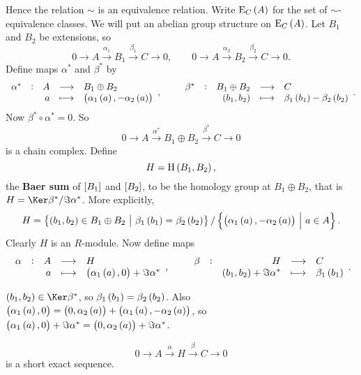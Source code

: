 Hence the relation $ \sim $ is an equivalence relation. Write $ \E_C\br{A} $ for the set of $ \sim $-equivalence classes. We will put an abelian group structure on $ \E_C\br{A} $. Let $ B_1 $ and $ B_2 $ be extensions, so
$$ 0 \to A \xrightarrow{\alpha_1} B_1 \xrightarrow{\beta_1} C \to 0, \qquad 0 \to A \xrightarrow{\alpha_2} B_2 \xrightarrow{\beta_2} C \to 0. $$
Define maps $ \alpha^* $ and $ \beta^* $ by
$$ \function[\alpha^*]{A}{B_1 \oplus B_2}{a}{\br{\alpha_1\br{a}, -\alpha_2\br{a}}}, \qquad \function[\beta^*]{B_1 \oplus B_2}{C}{\br{b_1, b_2}}{\beta_1\br{b_1} - \beta_2\br{b_2}}. $$
Now $ \beta^* \circ \alpha^* = 0 $. So
$$ 0 \to A \xrightarrow{\alpha^*} B_1 \oplus B_2 \xrightarrow{\beta^*} C \to 0 $$
is a chain complex. Define
$$ H = \H\br{B_1, B_2}, $$
the \textbf{Baer sum} of $ \sbr{B_1} $ and $ \sbr{B_2} $, to be the homology group at $ B_1 \oplus B_2 $, that is $ H = \Ker \beta^* / \Im \alpha^* $. More explicitly,
$$ H = \cbr{\br{b_1, b_2} \in B_1 \oplus B_2 \st \beta_1\br{b_1} = \beta_2\br{b_2}} / \cbr{\br{\alpha_1\br{a}, -\alpha_2\br{a}} \st a \in A}. $$
Clearly $ H $ is an $ R $-module. Now define maps
$$ \function[\alpha]{A}{H}{a}{\br{\alpha_1\br{a}, 0} + \Im \alpha^*}, \qquad \function[\beta]{H}{C}{\br{b_1, b_2} + \Im \alpha^*}{\beta_1\br{b_1}}. $$


\begin{note*}
$ \br{b_1, b_2} \in \Ker \beta^* $, so $ \beta_1\br{b_1} = \beta_2\br{b_2} $. Also $ \br{\alpha_1\br{a}, 0} = \br{0, \alpha_2\br{a}} + \br{\alpha_1\br{a}, -\alpha_2\br{a}} $, so $ \br{\alpha_1\br{a}, 0} + \Im \alpha^* = \br{0, \alpha_2\br{a}} + \Im \alpha^* $.
\end{note*}

\begin{proposition}
$$ 0 \to A \xrightarrow{\alpha} H \xrightarrow{\beta} C \to 0 $$
is a short exact sequence.
\end{proposition}

